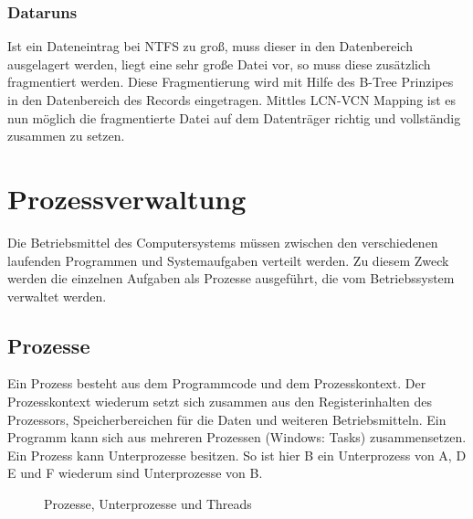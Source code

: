 \documentclass[12pt,a4paper]{article}
\begin{document}
\subsubsection{Dataruns}
    Ist ein Dateneintrag bei NTFS zu groß, muss dieser in den Datenbereich ausgelagert werden, liegt eine sehr große Datei vor, so muss diese zusätzlich fragmentiert werden. Diese Fragmentierung wird mit Hilfe des B-Tree Prinzipes in den Datenbereich des Records eingetragen. Mittles LCN-VCN Mapping ist es nun möglich die fragmentierte Datei auf dem Datenträger richtig und vollständig zusammen zu setzen.

\section{Prozessverwaltung}
    Die Betriebsmittel des Computersystems müssen zwischen den verschiedenen laufenden Programmen und Systemaufgaben verteilt werden. Zu diesem Zweck werden die einzelnen Aufgaben als Prozesse ausgeführt, die vom Betriebssystem verwaltet werden.

\subsection{Prozesse}
    Ein Prozess besteht aus dem Programmcode und dem Prozesskontext. Der Prozesskontext wiederum setzt sich zusammen aus den Registerinhalten des Prozessors, Speicherbereichen für die Daten und weiteren Betriebsmitteln.\newline
    Ein Programm kann sich aus mehreren Prozessen (Windows: Tasks) zusammensetzen. Ein Prozess kann Unterprozesse besitzen. So ist hier B ein Unterprozess von A, D E und F wiederum sind Unterprozesse von B.
    \begin{figure}[h]
    \centering
            \caption{Prozesse, Unterprozesse und Threads}
    \end{figure}
\end{document}
